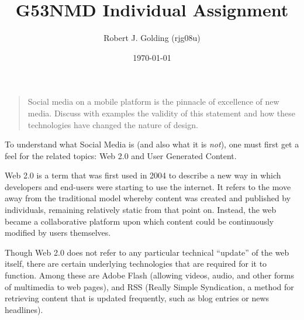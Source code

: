 \documentclass[a4paper]{article}
\title{G53NMD Individual Assignment}
\author{Robert J. Golding (rjg08u)} \date{\today}
\begin{document}
    \maketitle

    \begin{quote}
        Social media on a mobile platform is the pinnacle of excellence of new
        media. Discuss with examples the validity of this statement and how these
        technologies have changed the nature of design.
    \end{quote}

    To understand what Social Media is (and also what it is \emph{not}), one
    must first get a feel for the related topics: Web 2.0 and User Generated
    Content. \cite{kaplan2010}

    Web 2.0 is a term that was first used in 2004 to describe a new way in
    which developers and end-users were starting to use the internet. It refers
    to the move away from the traditional model whereby content was created and
    published by individuals, remaining relatively static from that point on.
    Instead, the web became a collaborative platform upon which content could
    be continuously modified by users themselves.

    Though Web 2.0 does not refer to any particular technical ``update'' of the
    web itself, there are certain underlying technologies that are required for
    it to function. Among these are Adobe Flash (allowing videos, audio, and
    other forms of multimedia to web pages), and RSS (Really Simple
    Syndication, a method for retrieving content that is updated frequently,
    such as blog entries or news headlines).

    
    
\end{document}
